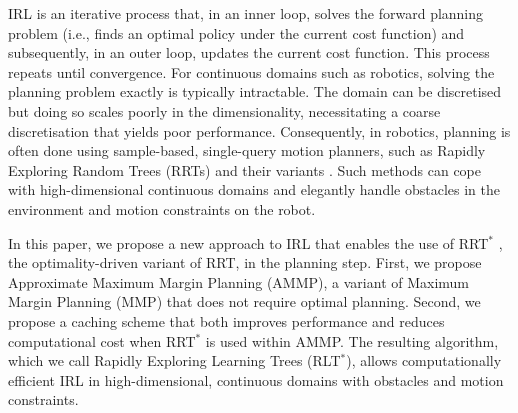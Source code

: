 \documentclass{article}  %
\begin{document}
IRL is an iterative process that, in an inner loop, solves the forward planning problem (i.e., finds an optimal policy under the current cost function) and subsequently, in an outer loop, updates the current cost function. This process repeats until convergence. For continuous domains such as robotics, solving the planning problem exactly is typically intractable. The domain can be discretised but doing so scales poorly in the dimensionality, necessitating a coarse discretisation that yields poor performance.  Consequently, in robotics, planning is often done using sample-based, single-query motion planners, such as Rapidly Exploring Random Trees (RRTs) \cite{lavalle1998rapidly} and their variants \cite{karaman2011sampling}. Such methods can cope with high-dimensional continuous domains and elegantly handle obstacles in the environment and motion constraints on the robot.



In this paper, we propose a new approach to IRL that enables the use of RRT$^*$ \cite{karaman2011sampling}, the optimality-driven variant of RRT, in the planning step.  First, we propose Approximate Maximum Margin Planning (AMMP), a variant of Maximum Margin Planning (MMP) \cite{ratliff2006maximum} that does not require optimal planning.  Second, we propose a caching scheme that both improves performance and reduces computational cost when RRT$^*$ is used within AMMP. The resulting algorithm, which we call Rapidly Exploring Learning Trees (RLT$^*$),  allows computationally efficient IRL in high-dimensional, continuous domains with obstacles and motion constraints. 
\end{document}
